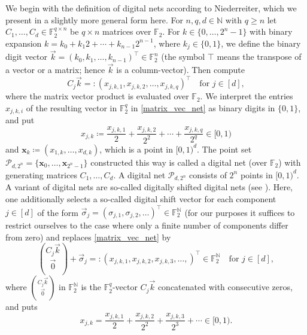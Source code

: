 \documentclass[12pt, a4paper]{article}
\def\P{\mathcal{P}}
\newcommand{\N}{{\mathbb{N}}} %
\begin{document}
We begin with the definition of digital nets according to Niederreiter, which we present in a slightly more general form here. For $n,q,d \in \N$ with $q \ge n$ let $C_1,\ldots, C_d \in \mathbb{F}_2^{q \times n}$ be $q \times n$ matrices over $\mathbb{F}_2$. For $k \in \{0,\ldots ,2^n-1\}$ with binary expansion $k = k_0 + k_1 2 + \cdots + k_{n-1} 2^{n-1}$, where $k_j \in \{0,1\}$, we define the binary digit vector $\vec{k} = (k_0, k_1, \ldots, k_{n-1})^\top \in \mathbb{F}_2^n$ (the symbol $\top$ means the transpose of a vector or a matrix; hence $\vec{k}$ is a column-vector). Then compute
\begin{equation}\label{matrix_vec_net}
C_j \vec{k} =:(x_{j,k,1}, x_{j,k,2},\ldots,x_{j,k,q})^\top \quad \mbox{for } j \in [d],
\end{equation}
where the matrix vector product is evaluated over $\mathbb{F}_2$. We interpret the entries $x_{j,k,i}$ of the resulting vector in $\mathbb{F}_2^q$ in \eqref{matrix_vec_net} as binary digits in $\{0,1\}$, and put
\begin{equation*}
x_{j,k} \coloneqq \frac{x_{j,k,1}}{2} + \frac{x_{j,k,2}}{2^2} + \cdots + \frac{x_{j,k,q}}{2^q} \in [0,1)
\end{equation*}
and $\boldsymbol{x}_k \coloneqq (x_{1,k}, \ldots, x_{d,k})$, which is a point in $[0,1)^d$. The point set $\P_{d, 2^n}=\{\boldsymbol{x}_0,\ldots,\boldsymbol{x}_{2^n-1}\}$ constructed this way is called a {digital net (over $\mathbb{F}_2$) with generating matrices} $C_1,\ldots,C_d$. A digital net $\P_{d, 2^n}$ consists of $2^n$ points in $[0,1)^d$.\\

A variant of digital nets are so-called digitally shifted digital nets (see \cite[Section~4.4.4]{DP10}). Here, one additionally selects a so-called digital shift vector for each component $j \in [d]$ of the form $\vec{\sigma}_j=(\sigma_{j,1},\sigma_{j,2},\ldots)^{\top} \in \mathbb{F}_2^{\mathbb{N}}$ (for our purposes it suffices to restrict ourselves to the case where only a finite number of components differ from zero) and replaces \eqref{matrix_vec_net} by
\begin{equation*}
{C_j \vec{k} \choose \vec{0}}+\vec{\sigma}_j =:(x_{j,k,1}, x_{j,k,2},x_{j,k,3},\ldots,)^\top \in \mathbb{F}_2^{\mathbb{N}} \quad \mbox{for } j \in [d],
\end{equation*}
where ${C_j \vec{k} \choose \vec{0}}$ in $\mathbb{F}_2^{\mathbb{N}}$ is the $\mathbb{F}_2^q$-vector $C_j \vec{k}$ concatenated with consecutive zeros, and puts
\begin{equation*}
x_{j,k} = \frac{x_{j,k,1}}{2} + \frac{x_{j,k,2}}{2^2} + \frac{x_{j,k,3}}{2^3} +\cdots  \in [0,1).
\end{equation*}
\end{document}
